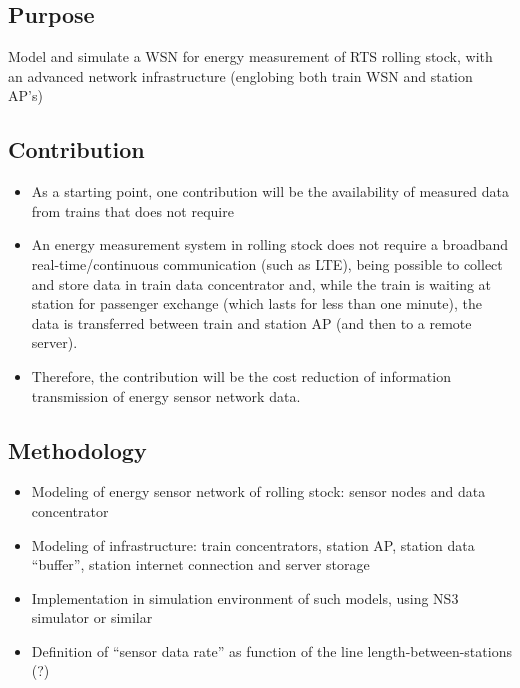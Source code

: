 \subsection{Purpose}
Model and simulate a WSN for energy measurement of RTS rolling stock, with an advanced network infrastructure (englobing both train WSN and station AP’s)

\subsection{Contribution}

\begin{itemize}
	\setlength\itemsep{1em}
	
	\item As a starting point, one contribution will be the availability of measured data from trains that does not require 
	
	\item An energy measurement system in rolling stock does not require a broadband real-time/continuous communication (such as LTE), being possible to collect and store data in train data concentrator and, while the train is waiting at station for passenger exchange (which lasts for less than one minute), the data is transferred between train and station AP (and then to a remote server).
	
	\item Therefore, the contribution will be the cost reduction of information transmission of energy sensor network data.
\end{itemize}

\subsection{Methodology}


\begin{itemize}
	\setlength\itemsep{0em}
	
	\item Modeling of energy sensor network of rolling stock: sensor nodes and data concentrator
	
	\item Modeling of infrastructure: train concentrators, station AP, station data “buffer”, station internet connection and server storage
	
	\item Implementation in simulation environment of such models, using NS3 simulator or similar
	
	\item Definition of “sensor data rate” as function of the line length-between-stations (?)
	
\end{itemize}


